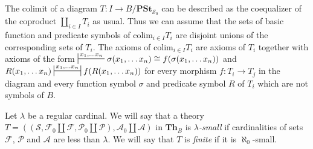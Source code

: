 \documentclass[reqno]{amsart}
\theoremstyle{definition}
\theoremstyle{remark}
\newcommand{\cat}[1]{\mathbf{#1}}
\newcommand{\colim}{\mathrm{colim}}
\newcommand{\Th}{\cat{Th}}
\newcommand{\PSt}{\cat{PSt}}
\numberwithin{figure}{section}
\begin{document}
The colimit of a diagram $T : I \to B/\PSt_{\mathcal{S}_0}$ can be described as the coequalizer of the coproduct $\coprod_{i \in I} T_i$ as usual.
Thus we can assume that the sets of basic function and predicate symbols of $\colim_{i \in I} T_i$ are disjoint unions of the corresponding sets of $T_i$.
The axioms of $\colim_{i \in I} T_i$ are axioms of $T_i$ together with axioms of the form $\sststile{}{x_1, \ldots x_n} \sigma(x_1, \ldots x_n) \cong f(\sigma(x_1, \ldots x_n))$
and $R(x_1, \ldots x_n) \ssststile{}{x_1, \ldots x_n} f(R(x_1, \ldots x_n))$ for every morphism $f : T_i \to T_j$
in the diagram and every function symbol $\sigma$ and predicate symbol $R$ of $T_i$ which are not symbols of $B$.

Let $\lambda$ be a regular cardinal.
We will say that a theory $T = ((\mathcal{S}, \mathcal{F}_0 \amalg \mathcal{F}, \mathcal{P}_0 \amalg \mathcal{P}), \mathcal{A}_0 \amalg \mathcal{A})$
in $\Th_B$ is \emph{$\lambda$-small} if cardinalities of sets $\mathcal{F}$, $\mathcal{P}$ and $\mathcal{A}$ are less than $\lambda$.
We will say that $T$ is \emph{finite} if it is $\aleph_0$-small.
\end{document}
